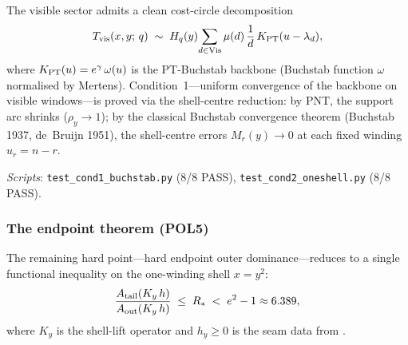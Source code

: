\documentclass[12pt,a4paper]{article}
\begin{document}
The visible sector admits a clean cost-circle decomposition
\begin{equation}
  T_{\rm vis}(x,y;\,q)
  \;\sim\; H_q(y)\!\sum_{d \in \mathrm{Vis}} \mu(d)\,
  \frac{1}{d}\,K_{\rm PT}(u - \lambda_d),
  \label{eq:visible_backbone}
\end{equation}
where $K_{\rm PT}(u) = e^\gamma\,\omega(u)$ is the PT-Buchstab
backbone (Buchstab function $\omega$ normalised by Mertens).
Condition~1---uniform convergence of the backbone on visible
windows---is proved via the shell-centre reduction: by PNT,
the support arc shrinks ($\rho_y \to 1$); by the classical
Buchstab convergence theorem (Buchstab 1937, de~Bruijn 1951),
the shell-centre errors $M_r(y)\to 0$ at each fixed winding
$u_r = n - r$.

\medskip\noindent
\textit{Scripts}:
\texttt{test\_cond1\_buchstab.py} (8/8 PASS),
\texttt{test\_cond2\_oneshell.py} (8/8 PASS).

\subsubsection{The endpoint theorem (POL5)}
\label{sec:ch9_POL5}

The remaining hard point---hard endpoint outer dominance---reduces
to a single functional inequality on the one-winding shell $x = y^2$:
\begin{equation}
  \frac{A_{\rm tail}(K_y\,h)}{A_{\rm out}(K_y\,h)}
  \;\leq\; R_*
  \;<\; e^2 - 1 \approx 6.389,
  \label{eq:POL5}
\end{equation}
where $K_y$ is the shell-lift operator and $h_y \geq 0$ is the seam
data from \cite{companion_M3}.
\end{document}
